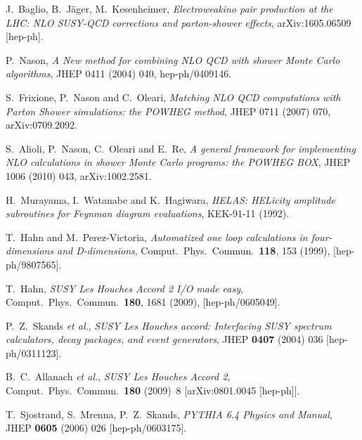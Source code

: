 \documentclass[a4paper,11pt]{article}
\begin{document}
\begin{thebibliography}{99}

 J.~Baglio, B.~J\"ager, M.~Kesenheimer, {\em 
  Electroweakino pair production at the LHC: NLO SUSY-QCD 
  corrections and parton-shower effects}, arXiv:1605.06509 [hep-ph].

 P.~Nason, {\em A New method for combining
  NLO QCD with shower Monte Carlo algorithms}, 
  JHEP 0411 (2004) 040, hep-ph/0409146.  

 S.~Frixione, P.~Nason and C.~Oleari, {\em 
  Matching NLO QCD computations with Parton Shower simulations: 
  the POWHEG method}, JHEP 0711 (2007) 070, arXiv:0709.2092. 

 S.~Alioli, P.~Nason, C.~Oleari and E.~Re, {\em A 
  general framework for implementing NLO calculations in shower Monte 
  Carlo programs: the POWHEG BOX}, JHEP 1006 (2010) 043, arXiv:1002.2581.

 H.~Murayama, I.~Watanabe and K.~Hagiwara, {\em
  HELAS: HELicity amplitude subroutines for Feynman diagram evaluations}, 
  KEK-91-11 (1992).

  T.~Hahn and M.~Perez-Victoria,
  {\em Automatized one loop calculations in four-dimensions and D-dimensions},
  Comput.\ Phys.\ Commun.\  {\bf 118}, 153 (1999),
  [hep-ph/9807565].

  T.~Hahn,
  {\em SUSY Les Houches Accord 2 I/O made easy},
  Comput.\ Phys.\ Commun.\  {\bf 180}, 1681 (2009),
  [hep-ph/0605049].

  P.~Z.~Skands  {\it et al.},
  {\em SUSY Les Houches accord: Interfacing SUSY spectrum calculators, decay packages, and event generators},  
  JHEP {\bf 0407} (2004) 036
  [hep-ph/0311123].

  B.~C.~Allanach  {\it et al.},
  {\em SUSY Les Houches Accord 2}, 
  Comput.\ Phys.\ Commun.\  {\bf 180} (2009)~8
  [arXiv:0801.0045 [hep-ph]].

  T.~Sjostrand, S.~Mrenna, P.~Z.~Skands,
  {\em PYTHIA 6.4 Physics and Manual},
  JHEP {\bf 0605 } (2006)  026
  [hep-ph/0603175]. 

\end{thebibliography}
\end{document}
